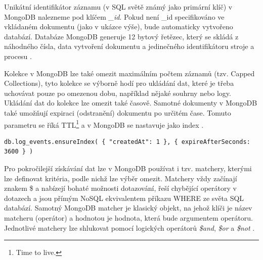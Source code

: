 Unikátní identifikátor záznamu (v SQL světě známý jako primární klíč) v MongoDB nalezneme pod klíčem \emph{\_id}. Pokud není \_id specifikováno ve vkládaném dokumentu (jako v ukázce výše), bude automaticky vytvořeno databází. Databáze MongoDB generuje 12 bytový řetězec, který se skládá z náhodného čísla, data vytvoření dokumentu a jedinečného identifikátoru stroje a procesu  \cite{mongoDocs}.

Kolekce v MongoDB lze také omezit maximálním počtem záznamů (tzv. Capped Collections), tyto kolekce se výborně hodí pro ukládání dat, které je třeba uchovávat pouze po omezenou dobu, například nějaké souhrny nebo logy. Ukládání dat do kolekce lze omezit také časově. Samotné dokumenty v MongoDB také umožňují expiraci (odstranění) dokumentu po určitém čase. Tomuto parametru se říká TTL\footnote{Time to live.} a v MongoDB se nastavuje jako index \cite{mongoDocs}.

\begin{lstlisting}[caption=Vytvoření indexu s parametrem expirace TTL 3600 sekund]
db.log_events.ensureIndex( { "createdAt": 1 }, { expireAfterSeconds: 3600 } )
\end{lstlisting}

Pro pokročilejší získávání dat lze v MongoDB používat i tzv. matchery, kterými lze definovat kritéria, podle nichž lze výběr omezit. Matchery vždy začínají znakem \$ a nabízejí bohaté možnosti dotazování, řeší chybějící operátory v dotazech a jsou přímým NoSQL ekvivalentem příkazu WHERE ze světa SQL databází. Samotný MongoDB matcher je klasický objekt, na jehož klíči je název matcheru (operátor) a hodnotou je hodnota, která bude argumentem operátoru. Jednotlivé matchery lze shlukovat pomocí logických operátorů \emph{\$and},  \emph{\$or} a \emph{\$not} \cite{mongoDocs}.
\pagebreak


